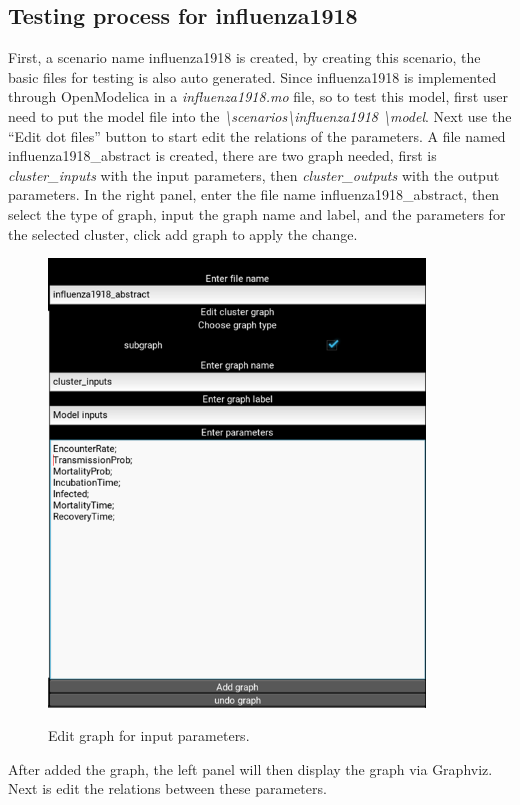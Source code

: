 \subsection{Testing process for influenza1918}
First, a scenario name influenza1918 is created, by creating this scenario, the basic files for testing is also auto generated. Since influenza1918 is implemented through OpenModelica in a \textsl{influenza1918.mo} file, so to test this model, first user need to put the model file into the \textsl{\textbackslash scenarios\textbackslash influenza1918 \textbackslash model}. Next use the “Edit dot files” button to start edit the relations of the parameters. A file named influenza1918\_abstract is created, there are two graph needed, first is \textsl{cluster\_inputs} with the input parameters, then \textsl{cluster\_outputs} with the output parameters. In the right panel, enter the file name influenza1918\_abstract, then select the type of graph, input the graph name and label, and the parameters for the selected cluster, click add graph to apply the change.
\begin{figure}[H]
	\centering
	\includegraphics[width=10cm]{figures/influenzaTestProcess3.png}\\
	\caption{Edit graph for input parameters.}
	\label{fig:figure21}
\end{figure}
\noindent 
After added the graph, the left panel will then display the graph via Graphviz. Next is edit the relations between these parameters.
